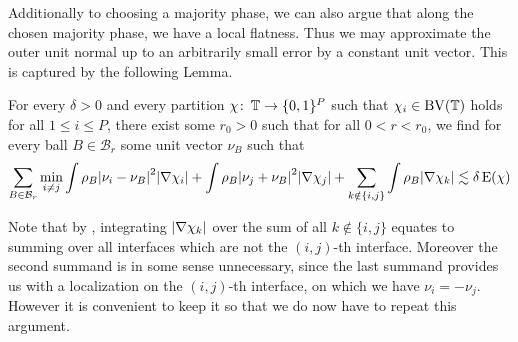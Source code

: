 Additionally to choosing a majority phase, we can also argue that along the 
chosen majority phase, we have a local flatness. Thus we may approximate the 
outer unit normal up to an arbitrarily small error by a constant unit vector. 
This is captured by the following Lemma.

\begin{lemma}
	\label{localization_lemma_with_normals}
	For every $ \delta > 0 $ and every partition $ \chi \colon \operatorname{\mathbb{T}} \to \{ 0 , 1 \}^{ P } $ such that $ \chi_{ i } \in \operatorname{BV} ( \operatorname{\mathbb{T}} ) $ holds for all $ 1 \leq i \leq P $, there exist some $ r_{ 0 } > 0 $ such that for all $ 0 < r < r_{ 0 } $, we find for every ball $ B \in \mathcal{B}_{ r } $ some unit vector $ \nu_{ B } $ such that
	\begin{equation*}
		\sum_{ B \in \mathcal{B}_{ r } }
			\min_{ i \neq j }
				\int
					\rho_{ B }
					\abs{ \nu_{ i } - \nu_{ B } }^{ 2 }
				\abs{ \nabla \chi_{ i } }
				+
				\int
					\rho_{ B }
					\abs{ \nu_{ j } + \nu_{ B } }^{ 2 }
				\abs{ \nabla \chi_{ j } }
				+
				\sum_{ k \notin \{ i , j \} }
					\int 
						\rho_{ B }
					\abs{ \nabla \chi_{ k } }
		\lesssim
		\delta \operatorname{E} ( \chi )
	\end{equation*}
\end{lemma}
	
Note that by , integrating  $ \abs{ \nabla \chi_{ k } } $ over the sum of all $ k \notin \{ i , j \} $ equates to summing over all interfaces which are not the $ (i,j)$-th interface. Moreover the second summand is in some sense unnecessary, since the last summand provides us with a localization on the $ (i,j)$-th interface, on which we have $ \nu_{ i } = - \nu_{ j } $.
However it is convenient to keep it so that we do now have to repeat this argument.

